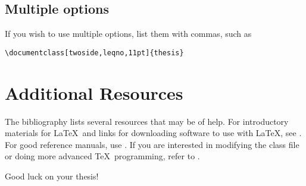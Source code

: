 \documentclass[12pt]{thesis}
\begin{document}
\section{Multiple options}
If you wish to use multiple options, list them with commas, such as
\begin{verbatim}
\documentclass[twoside,leqno,11pt]{thesis}
\end{verbatim}

\chapter{Additional Resources}
The bibliography lists several resources that may be of help. For introductory materials for \LaTeX\ and links for downloading software to use with \LaTeX, see \cite{computation-page}. For good reference manuals, use \cite{lamport, goossens, kopka-daly}. If you are interested in modifying the class file or doing more advanced \TeX\ programming, refer to \cite{knuth}.

Good luck on your thesis!

\appendix




\printindex
\end{document}
